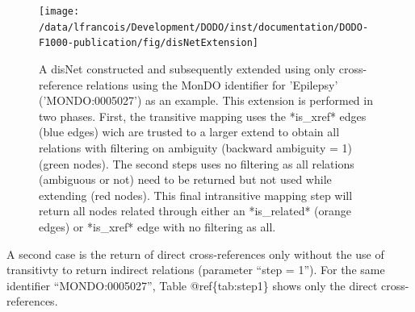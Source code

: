 \documentclass[9pt,a4paper,]{extarticle}
\begin{document}
\begin{figure}

{\centering \texttt{[image: /data/lfrancois/Development/DODO/inst/documentation/DODO-F1000-publication/fig/disNetExtension]} 

}

\caption{A disNet constructed and subsequently extended using only cross-reference relations using the MonDO identifier for 'Epilepsy' ('MONDO:0005027') as an example. This extension is performed in two phases. First, the transitive mapping uses the *is\_xref* edges (blue edges) wich are trusted to a larger extend to obtain all relations with filtering on ambiguity (backward ambiguity = 1) (green nodes). The second steps uses no filtering as all relations (ambiguous or not) need to be returned but not used while extending (red nodes). This final intransitive mapping step will return all nodes related through either an *is\_related* (orange edges) or *is\_xref* edge with no filtering as all.}\label{fig:extension}
\end{figure}

A second case is the return of direct cross-references only without the use of transitivty to return indirect relations (parameter ``step = 1''). For the same identifier ``MONDO:0005027'', Table @ref\{tab:step1\} shows only the direct cross-references.
\end{document}
